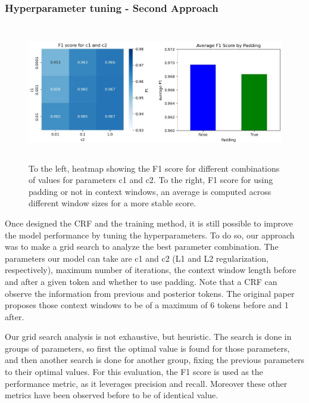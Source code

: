 \documentclass{article}
\begin{document}
\subsubsection*{Hyperparameter tuning - Second Approach}
\begin{figure}[!t]
	\centering
	\includegraphics[height=6cm]{images/crf_heatmap_bars.jpg}
	\captionsetup{width=0.9\textwidth}
	\caption{To the left, heatmap showing the F1 score for different combinations of values for parameters
	c1 and c2. To the right, F1 score for using padding or not in context windows, an average is computed
	across different window sizes for a more stable score.}
	\label{fig:crf_heatmap_bars}
\end{figure}

Once designed the CRF and the training method, it is still possible to improve the model performance
by tuning the hyperparameters. To do so, our approach
was to make a grid search to analyze the best parameter combination. The parameters our model can take
are c1 and c2 (L1 and L2 regularization, respectively), maximum number of iterations, the context window
length before and after a given token and whether to use padding. Note that a CRF can observe the information
from previous and posterior tokens. The original paper proposes those context windows to be of a maximum of 6
tokens before and 1 after.

Our grid search analysis is not exhaustive, but heuristic. The search is done in groups of parameters, so
first the optimal value is found for those parameters, and then another search is done for another group,
fixing the previous parameters to their optimal values. For this evaluation, the F1 score is used as the
performance metric, as it leverages precision and recall. Moreover these other metrics have been observed
before to be of identical value.
\end{document}
